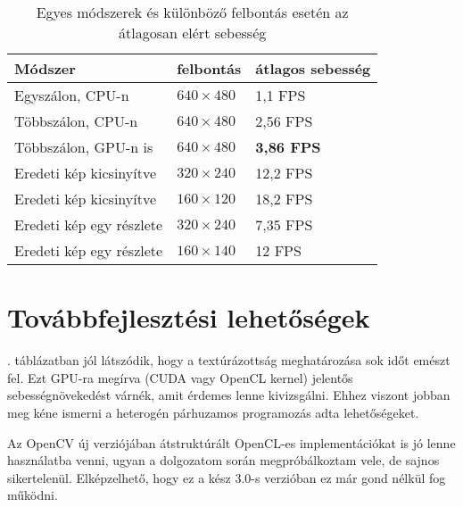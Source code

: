 \begin{table}[tbh]
\centering

\begin{tabular}{|l|l|l|}
\hline
Módszer & felbontás & átlagos sebesség \\ \hline\hline

Egyszálon, CPU-n & $640\times 480$ & 1,1 FPS \\ \hline
Többszálon, CPU-n & $640\times 480$ & 2,56 FPS \\ \hline
Többszálon, GPU-n is & $640\times 480$ & \textbf{3,86 FPS} \\ \hline\hline

Eredeti kép kicsinyítve & $320\times 240$ & 12,2 FPS \\ \hline
Eredeti kép kicsinyítve & $160\times 120$ & 18,2 FPS \\ \hline\hline

Eredeti kép egy részlete & $320\times 240$ & 7,35 FPS \\ \hline
Eredeti kép egy részlete & $160\times 140$ & 12 FPS \\ \hline

\end{tabular} 

\caption{Egyes módszerek és különböző felbontás esetén az átlagosan elért sebesség \label{table:results}}
\end{table}


\section{Továbbfejlesztési lehetőségek}

. táblázatban jól látszódik, hogy a textúrázottság meghatározása sok időt emészt fel. Ezt GPU-ra megírva (CUDA vagy OpenCL kernel) jelentős sebességnövekedést várnék, amit érdemes lenne kivizsgálni. Ehhez viszont jobban meg kéne ismerni a heterogén párhuzamos programozás adta lehetőségeket.

Az OpenCV új verziójában átstruktúrált OpenCL-es implementációkat is jó lenne használatba venni, ugyan a dolgozatom során megpróbálkoztam vele, de sajnos sikertelenül. Elképzelhető, hogy ez a kész 3.0-s verzióban ez már gond nélkül fog működni.


